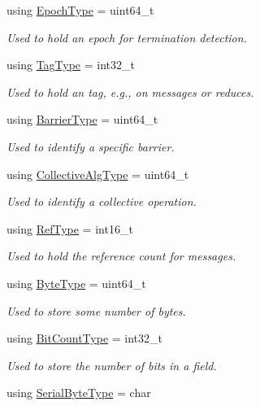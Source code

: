 \begin{DoxyCompactItemize}
using \hyperlink{namespacevt_a985a5adf291c34a3ca263b3378388236}{Epoch\+Type} = uint64\+\_\+t
\begin{DoxyCompactList}\small\item\em Used to hold an epoch for termination detection. \end{DoxyCompactList}\item 
using \hyperlink{namespacevt_a84ab281dae04a52a4b243d6bf62d0e52}{Tag\+Type} = int32\+\_\+t
\begin{DoxyCompactList}\small\item\em Used to hold an tag, e.\+g., on messages or reduces. \end{DoxyCompactList}\item 
using \hyperlink{namespacevt_a25e481f0d6bbc7204db23d1c87a62e77}{Barrier\+Type} = uint64\+\_\+t
\begin{DoxyCompactList}\small\item\em Used to identify a specific barrier. \end{DoxyCompactList}\item 
using \hyperlink{namespacevt_a5ffcf8e168b77b0f36e11b616049a1cf}{Collective\+Alg\+Type} = uint64\+\_\+t
\begin{DoxyCompactList}\small\item\em Used to identify a collective operation. \end{DoxyCompactList}\item 
using \hyperlink{namespacevt_a9b39ce9494bb04674d0d5b895a5aa50f}{Ref\+Type} = int16\+\_\+t
\begin{DoxyCompactList}\small\item\em Used to hold the reference count for messages. \end{DoxyCompactList}\item 
using \hyperlink{namespacevt_aab8d55968084610ce3b17057981e9300}{Byte\+Type} = uint64\+\_\+t
\begin{DoxyCompactList}\small\item\em Used to store some number of bytes. \end{DoxyCompactList}\item 
using \hyperlink{namespacevt_acaf7da00eb37dfb0c3479a6a982c30ef}{Bit\+Count\+Type} = int32\+\_\+t
\begin{DoxyCompactList}\small\item\em Used to store the number of bits in a field. \end{DoxyCompactList}\item 
using \hyperlink{namespacevt_ad48e08beb69a7f184fb1fdb4b7044174}{Serial\+Byte\+Type} = char

\end{DoxyCompactItemize}
